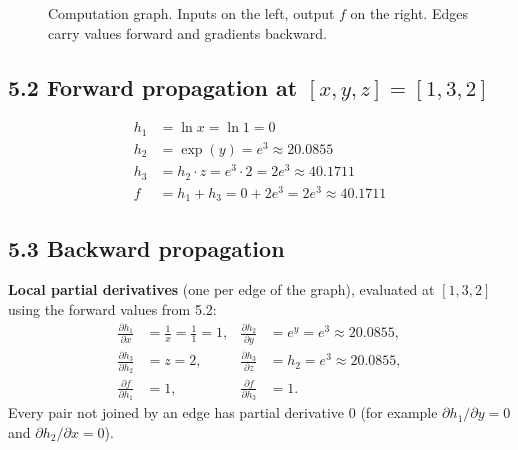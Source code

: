 \documentclass[11pt]{article}
\begin{document}
\begin{figure}[H]
\centering
{}
\caption{Computation graph. Inputs on the left, output $f$ on the right. Edges carry values forward and gradients backward.}
\end{figure}

\subsection*{5.2 Forward propagation at $[x,y,z] = [1,3,2]$}
\begin{align*}
h_1 &= \ln x = \ln 1 = 0\\
h_2 &= \exp(y) = e^{3} \approx 20.0855\\
h_3 &= h_2\cdot z = e^{3}\cdot 2 = 2e^{3} \approx 40.1711\\
f &= h_1 + h_3 = 0 + 2e^{3} = 2e^{3} \approx 40.1711
\end{align*}

\subsection*{5.3 Backward propagation}
\textbf{Local partial derivatives} (one per edge of the graph), evaluated at $[1,3,2]$ using the forward values from 5.2:
\begin{align*}
\frac{\partial h_1}{\partial x} &= \frac{1}{x} = \frac{1}{1} = 1, &
\frac{\partial h_2}{\partial y} &= e^{y} = e^{3}\approx 20.0855,\\
\frac{\partial h_3}{\partial h_2} &= z = 2, &
\frac{\partial h_3}{\partial z} &= h_2 = e^{3}\approx 20.0855,\\
\frac{\partial f}{\partial h_1} &= 1, &
\frac{\partial f}{\partial h_3} &= 1.
\end{align*}
Every pair not joined by an edge has partial derivative $0$ (for example $\partial h_1/\partial y = 0$ and $\partial h_2/\partial x = 0$).
\end{document}
